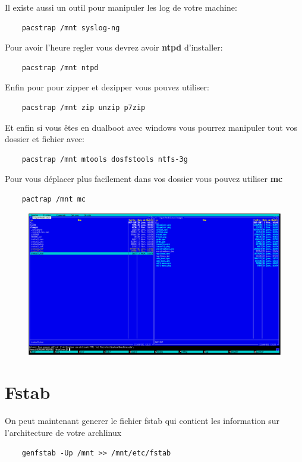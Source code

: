 \documentclass[a4paper]{book}
\begin{document}
  Il existe aussi un outil pour manipuler les log de votre machine\@:\\
  \begin{lstlisting}
    pacstrap /mnt syslog-ng
  \end{lstlisting}
  Pour avoir l'heure regler vous devrez avoir \textbf{ntpd} d'installer\@:\\
  \begin{lstlisting}
    pacstrap /mnt ntpd
  \end{lstlisting}
  Enfin pour pour zipper et dezipper vous pouvez utiliser\@:\\
  \begin{lstlisting}
    pacstrap /mnt zip unzip p7zip
  \end{lstlisting}
  Et enfin si vous êtes en dualboot avec windows vous pourrez manipuler tout vos
  dossier et fichier avec\@:\\
  \begin{lstlisting}
    pacstrap /mnt mtools dosfstools ntfs-3g
  \end{lstlisting}
  Pour vous déplacer plus facilement dans vos dossier vous pouvez utiliser
  \textbf{mc}\\
  \begin{lstlisting}
    pactrap /mnt mc
  \end{lstlisting}
  
  \begin{figure}[h]
    \includegraphics[width=\textwidth]{images/mc}
  \end{figure}
  
  \section{Fstab}
  On peut maintenant generer le fichier fstab qui contient les information sur
  l'architecture de votre archlinux\\
  \begin{lstlisting}
    genfstab -Up /mnt >> /mnt/etc/fstab
  \end{lstlisting}
  
\end{document}
